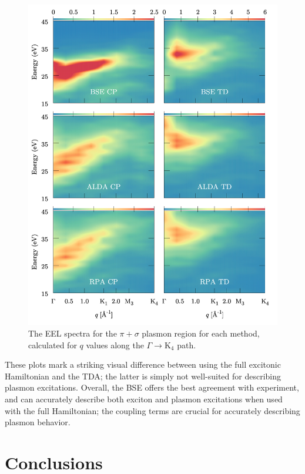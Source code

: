 \documentclass[aps,prb,10pt,showpacs,superscriptaddress,twocolumn,notitlepage]{revtex4-1}
\begin{document}
\begin{figure}[t]
\includegraphics[width=\linewidth]{fig10}
\caption{The EEL spectra for the $\pi + \sigma$ plasmon region for each method,
calculated for $q$ values along the $\Gamma \rightarrow \mathrm{K}_{4}$ path.}
\label{fig:gk-heatmap_hi}
\end{figure}

These plots mark a striking visual difference between using the full excitonic
Hamiltonian and the TDA; the latter is simply not well-suited for describing
plasmon excitations. Overall, the BSE offers the best agreement with experiment,
and can accurately describe both exciton and plasmon excitations when used with
the full Hamiltonian; the coupling terms are crucial for accurately describing
plasmon behavior.


\section{Conclusions}\label{sec:conclusions}
\end{document}
